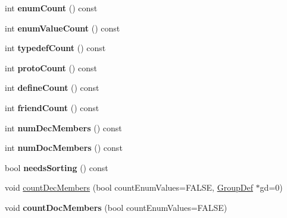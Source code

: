 \begin{DoxyCompactItemize}
\item 
\hypertarget{class_member_list_ac9567fb822ca9dc34a8f81274a737a43}{int {\bfseries enum\-Count} () const }\label{class_member_list_ac9567fb822ca9dc34a8f81274a737a43}

\item 
\hypertarget{class_member_list_ac262de798638c225648f3c872be6b818}{int {\bfseries enum\-Value\-Count} () const }\label{class_member_list_ac262de798638c225648f3c872be6b818}

\item 
\hypertarget{class_member_list_a5b9c676247b39b4954ad23fa5bbf9e44}{int {\bfseries typedef\-Count} () const }\label{class_member_list_a5b9c676247b39b4954ad23fa5bbf9e44}

\item 
\hypertarget{class_member_list_ad5f4ba0c47bb31003b8db0501b66d585}{int {\bfseries proto\-Count} () const }\label{class_member_list_ad5f4ba0c47bb31003b8db0501b66d585}

\item 
\hypertarget{class_member_list_afeab0f0806bf85ae112d70d3f59d0ced}{int {\bfseries define\-Count} () const }\label{class_member_list_afeab0f0806bf85ae112d70d3f59d0ced}

\item 
\hypertarget{class_member_list_a8f80ae93edcb369f2676530f693f4938}{int {\bfseries friend\-Count} () const }\label{class_member_list_a8f80ae93edcb369f2676530f693f4938}

\item 
\hypertarget{class_member_list_a08247bad0051f28e6868e0f7da7864e5}{int {\bfseries num\-Dec\-Members} () const }\label{class_member_list_a08247bad0051f28e6868e0f7da7864e5}

\item 
\hypertarget{class_member_list_ab6e1e3c9200fa51d1751fed0c4ce7d7f}{int {\bfseries num\-Doc\-Members} () const }\label{class_member_list_ab6e1e3c9200fa51d1751fed0c4ce7d7f}

\item 
\hypertarget{class_member_list_ad7bf91d8cad2c1ba2318941fac75102d}{bool {\bfseries needs\-Sorting} () const }\label{class_member_list_ad7bf91d8cad2c1ba2318941fac75102d}

\item 
void \hyperlink{class_member_list_a1482ff648fcc820f761afb54c74025ed}{count\-Dec\-Members} (bool count\-Enum\-Values=F\-A\-L\-S\-E, \hyperlink{class_group_def}{Group\-Def} $\ast$gd=0)
\item 
\hypertarget{class_member_list_aed2279d1767047c5f5be70b04cb63a40}{void {\bfseries count\-Doc\-Members} (bool count\-Enum\-Values=F\-A\-L\-S\-E)}\label{class_member_list_aed2279d1767047c5f5be70b04cb63a40}


\end{DoxyCompactItemize}
